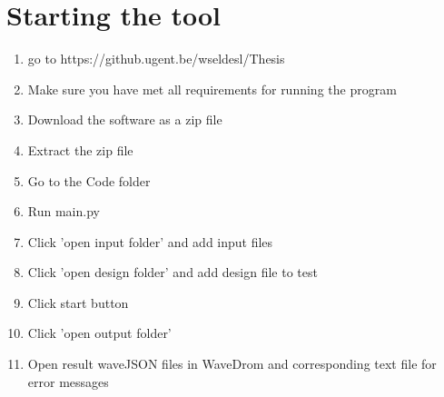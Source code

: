\section{Starting the tool}
\begin{enumerate}
	\item go to https://github.ugent.be/wseldesl/Thesis
	\item Make sure you have met all requirements for running the program 
	\item Download the software as a zip file
	\item Extract the zip file
	\item Go to the Code folder
	\item Run main.py
	\item Click 'open input folder' and add input files
	\item Click 'open design folder' and add design file to test
	\item Click start button
	\item Click 'open output folder'
	\item Open result waveJSON files in WaveDrom and corresponding text file for error messages
\end{enumerate}

	

